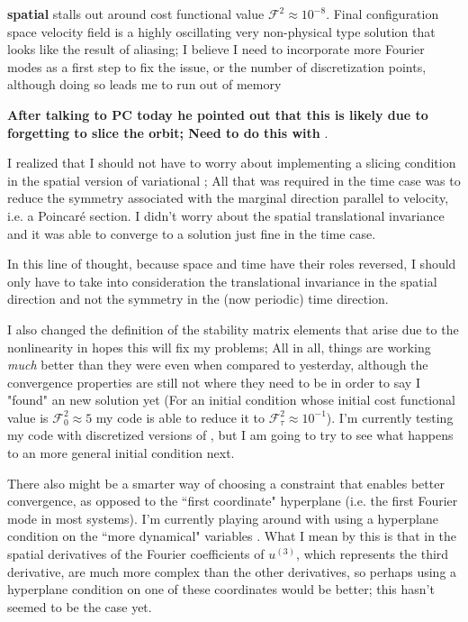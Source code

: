 {\bf spatial {\descent}} stalls out around
cost functional value $\mathcal{F}^2 \approx 10^{-8}$. Final configuration
space velocity field is a highly oscillating very non-physical
 type solution that looks like the result of aliasing; I believe I need
to incorporate more Fourier modes as a first step to fix the
 issue, or the number of discretization points, although doing so leads me
to run out of memory

\textbf{After talking to PC today he pointed out that
this is likely due to forgetting to slice the orbit; Need to do this with {\fFslice}}.


I realized that I should not have to worry about implementing a slicing condition
in the spatial version of variational {\descent}; All that was required in the
time case was to reduce the symmetry associated with the marginal direction parallel to
velocity, i.e. a Poincar\'e section. I didn't worry about the spatial translational invariance
and it was able to converge to a solution just fine in the time case.

In this line of thought, because space and time have their roles
reversed, I should only have to take into consideration the translational
invariance in the spatial direction and not the  symmetry in the (now periodic)
time direction.

I also changed the definition of the stability matrix elements that arise due
to the nonlinearity in hopes this will fix my problems; All in all, things are
working \emph{much} better than they were even when compared to yesterday,
although the convergence properties are still not where they need to be in
order to say I "found" an new solution yet (For an initial condition whose
initial cost functional value is $\mathcal{F}_0^2 \approx 5$ my code is able to
reduce it to $\mathcal{F}_{\tau}^2 \approx 10^{-1}$). I'm currently testing my
code with discretized versions of , but I am going to try to see what
happens to an more general initial condition next.

There also might be a smarter way of choosing a constraint that enables better
convergence, as opposed to the ``first coordinate" hyperplane (i.e. the first
Fourier mode in most systems). I'm currently playing around with using a
hyperplane condition on the ``more dynamical" variables . What I mean by this is that in
 the spatial derivatives of the Fourier coefficients of
$u^{(3)}$, which represents the third derivative, are much more complex than
the other derivatives, so perhaps using a hyperplane condition on one of these
coordinates would be better; this hasn't seemed to be the case yet.


